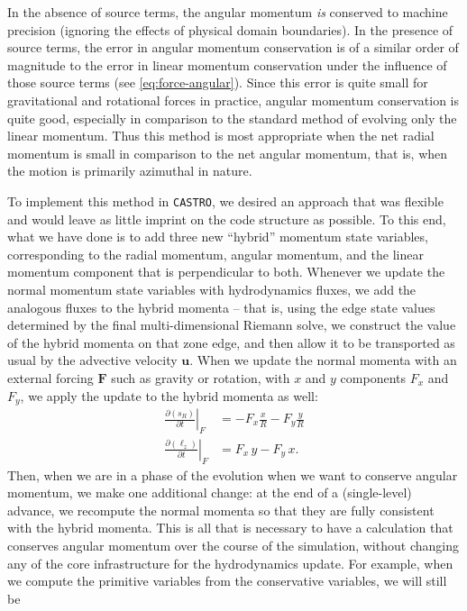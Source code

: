 \documentclass[twocolumn,numberedappendix]{../aastex6}
\newcommand{\castro}{\texttt{CASTRO}}
\begin{document}
In the absence of source terms, the angular momentum \textit{is} conserved
to machine precision (ignoring the effects of physical domain boundaries). In the
presence of source terms, the error in angular momentum conservation is of a
similar order of magnitude to the error in linear momentum conservation under
the influence of those source terms (see \autoref{eq:force-angular}). Since this
error is quite small for gravitational and rotational forces in practice, angular
momentum conservation is quite good, especially in comparison to the standard
method of evolving only the linear momentum. Thus this method is most appropriate
when the net radial momentum is small in comparison to the net angular momentum,
that is, when the motion is primarily azimuthal in nature.

To implement this method in \castro, we desired an approach that was flexible
and would leave as little imprint on the code structure as possible.
To this end, what we have done is to add three new ``hybrid'' momentum state
variables, corresponding to the radial momentum, angular momentum, and the linear
momentum component that is perpendicular to both. Whenever we update the normal
momentum state variables with hydrodynamics fluxes, we add the analogous fluxes
to the hybrid momenta -- that is, using the edge state values determined by the
final multi-dimensional Riemann solve, we construct the value of the hybrid
momenta on that zone edge, and then allow it to be transported as usual by the
advective velocity $\mathbf{u}$. When we update the normal momenta with an
external forcing $\mathbf{F}$ such as gravity or rotation, with $x$ and $y$
components $F_x$ and $F_y$, we apply the update to the hybrid momenta as well:
\begin{align}
  \left.\frac{\partial(s_R)}{\partial t}\right|_{F} &= -F_x \frac{x}{R} - F_y\frac{y}{R} \label{eq:force-radial}\\
  \left.\frac{\partial(\ell_z)}{\partial t}\right|_{F} &= F_x\, y - F_y\, x.\label{eq:force-angular}
  \end{align}
Then, when we are in a phase of the evolution when we want to conserve angular
momentum, we make one additional change: at the end of a (single-level) advance,
we recompute the normal momenta so that they are fully consistent with the hybrid
momenta. This is all that is necessary to have a calculation that conserves angular
momentum over the course of the simulation, without changing any of the
core infrastructure for the hydrodynamics update. For example, when we compute
the primitive variables from the conservative variables, we will still be
\end{document}

